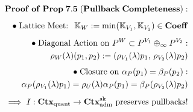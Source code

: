 \documentclass[preview]{standalone}
\begin{document}
\begin{align*}
\special{dvisvgm:raw <g id='unique000'>}\mathbf{Proof\;of\;Prop\;7.5\;(Pullback\;Completeness):}\\[5pt]\bullet\;\text{Lattice Meet: }\;\mathbb{K}_W := \min(\mathbb{K}_{V_1},\mathbb{K}_{V_2})\in\mathbf{Coeff}\\[4pt]\bullet\;\text{Diagonal Action on }P^W\subset P^{V_1}\oplus_\infty P^{V_2}:\\\;\;\rho_W(\lambda)(p_1,p_2) := (\rho_{V_1}(\lambda)p_1,\, \rho_{V_2}(\lambda)p_2)\\[4pt]\bullet\;\text{Closure on }\alpha_P(p_1)=\beta_P(p_2):\\\;\;\alpha_P(\rho_{V_1}(\lambda)p_1) = \rho_U(\lambda)\alpha_P(p_1) = \beta_P(\rho_{V_2}(\lambda)p_2)\\[4pt]\implies I:\mathbf{Ctx}_{\text{quant}}\to\mathbf{Ctx}_{\text{adm}}^{\text{sk}}\text{ preserves pullbacks!}\special{dvisvgm:raw </g>}
\end{align*}
\end{document}

